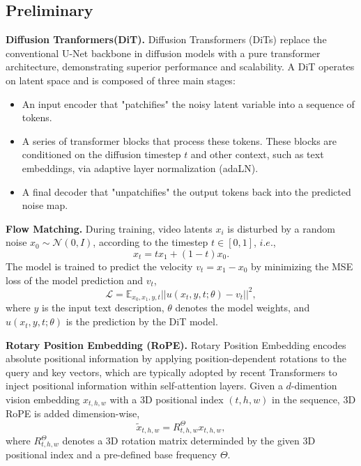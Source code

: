 \subsection{Preliminary}
\textbf{Diffusion Tranformers(DiT).}
Diffusion Transformers (DiTs) \citep{peebles2023scalable} replace the conventional U-Net backbone in diffusion models with a pure transformer architecture, demonstrating superior performance and scalability. A DiT operates on latent space and is composed of three main stages:
\begin{itemize}
    \item An input encoder that "patchifies" the noisy latent variable into a sequence of tokens.
    \item A series of transformer blocks that process these tokens. These blocks are conditioned on the diffusion timestep $t$ and other context, such as text embeddings, via adaptive layer normalization (adaLN).
    \item A final decoder that "unpatchifies" the output tokens back into the predicted noise map.
\end{itemize}



\noindent\textbf{Flow Matching.} 
During training, video latents $x_i$ is disturbed by a random noise $x_0 \sim \mathcal{N}(0, I)$, according to the timestep $t \in[0,1]$, $i.e.$,
\begin{equation}\label{x_t}
    x_{t}=t x_{1}+(1-t) x_{0}.
\end{equation}
The model is trained to predict the velocity $v_t = x_1 - x_0$ by minimizing the MSE loss of the model prediction and $v_t$,
\begin{equation}\label{rf_loss}
\mathcal{L} = \mathbb{E}_{x_0, x_1, y, t}||u(x_t, y, t; \theta)-v_t||^2,
\end{equation}
where $y$ is the input text description, $\theta$ denotes the model weights, and $u(x_t, y, t; \theta)$ is the prediction by the DiT model. 

\noindent\textbf{Rotary Position Embedding (RoPE).} 
Rotary Position Embedding\citep{heo2024rotary} encodes absolute positional information by applying position-dependent rotations to the query and key vectors, which are typically adopted by recent Transformers to inject positional information within self-attention layers. Given a $d$-dimention vision embedding $x_{t,h,w}$ with a 3D positional index $(t, h, w)$ in the sequence, 3D RoPE is added dimension-wise,
\begin{equation}\label{3d_rope}
\tilde{x}_{t,h,w} = R^{\Theta}_{t,h,w} x_{t,h,w},
\end{equation}
where $R^{\Theta}_{t,h,w}$ denotes a 3D rotation matrix determinded by the given 3D positional index and a pre-defined base frequency $\Theta$.

